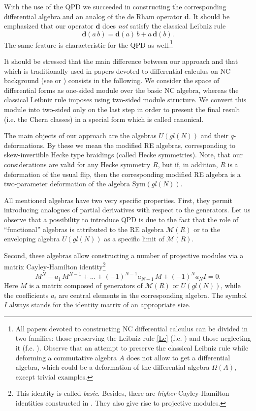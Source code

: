 \documentclass[11pt]{article}
\newcommand{\MM}{\mathcal{M}}
\newcommand{\Om}{\Omega}
\newcommand{\dd}{\mathbf{d}}
\numberwithin{equation}{section}
\theoremstyle{plain}
\theoremstyle{definition}
\begin{document}
With the use of the QPD we succeeded in constructing the corresponding differential algebra and an analog of the de Rham operator
$\dd$. It should be emphasized that our operator $\dd$ does \emph{not} satisfy the classical Leibniz rule
\begin{equation}
\dd(a\, b)=\dd(a)\, b+a\, \dd (b).
\label{Le}
\end{equation}
The same feature is characteristic for the QPD  as well.\footnote{All papers devoted to constructing NC differential calculus can be divided in two
families: those preserving the Leibniz rule \eqref{Le} (f.e. \cite{BM})   and those neglecting it (f.e. \cite{FP}). Observe that an attempt to
preserve the classical Leibniz rule while deforming a  commutative algebra $A$ does not allow to get a differential algebra, which could
be a deformation of the differential algebra $\Om(A)$, except trivial examples. }

It should be stressed that the main difference between our approach and that which is traditionally used in papers devoted to  differential calculus  on NC
background (see \cite{DVL} or \cite{La}) consists in the following. We consider the space of differential forms as one-sided module over the basic NC algebra, whereas
the classical Leibniz rule imposes using two-sided module structure.
We convert this module into two-sided only on the last step in order to present the final result (i.e. the Chern classes) in a special form  which is called canonical.


The main objects of our approach are the algebras $U(gl(N))$ and their $q$-deformations. By these we mean the modified RE algebras,
corresponding to skew-invertible Hecke type braidings (called Hecke symmetries). Note, that our considerations are valid for any Hecke
symmetry $R$, but if, in addition, $R$ is a deformation of the usual flip, then the corresponding modified RE algebra is a two-parameter
deformation of the algebra $\mathrm{Sym}(gl(N))$.

All mentioned algebras have two very specific properties. First, they permit introducing analogues of partial derivatives with respect to
the generators. Let us observe  that a possibility to introduce QPD is due to the fact that the role of  ``functional'' algebras is attributed
to the RE algebra $\MM(R)$ or to the enveloping algebra $U(gl(N))$ as a specific limit of $\MM(R)$.

Second, these algebras allow constructing a number of projective modules via a matrix Cayley-Hamilton identity\footnote{This identity
is called \emph{basic}. Besides, there are \emph{higher} Cayley-Hamilton identities constructed in \cite{GS0}. They also give rise
to projective modules.}
\begin{equation}
M^N-a_1\, M^{N-1}+...+(-1)^{N-1} a_{N-1}\, M+(-1)^{N} a_N I=0.
\label{CH0}
\end{equation}
Here $M$ is a matrix composed of generators of $\MM(R)$ or $U(gl(N))$, while the coefficients $a_i$ are central elements in
the corresponding algebra. The symbol $I$ always stands for the identity matrix of an appropriate size.
\end{document}
